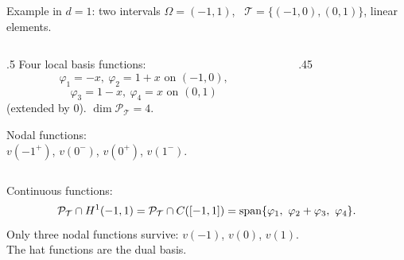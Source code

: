 \begin{frame}{Example in $d=1$: two intervals}
    $\Omega = (-1,1)$, \ $\mathcal T = \{(-1,0), (0,1)\}$, linear elements.
    \medskip

    \begin{columns}[T,onlytextwidth]
        \begin{column}{.5\textwidth}
            Four local basis functions:
            \[
                \varphi_1 = -x, \ \varphi_2 = 1 + x \text{ on } (-1,0),
            \]
            \[
                \varphi_3 = 1 - x, \ \varphi_4 = x \text{ on } (0,1)
            \]
            (extended by $0$). $\dim \mathcal P_{\mathcal T} = 4$.
            \medskip

            Nodal functions:\\ $v(-1^+)$, $v(0^-)$, $v(0^+)$, $v(1^-)$.
        \end{column}
        \begin{column}{.45\textwidth}
            \centering
        \end{column}
    \end{columns}
    \medskip
    Continuous functions:
    \[
        \mathcal P_{\mathcal T} \cap H^1(-1,1) = \mathcal P_{\mathcal T} \cap C([-1,1]) = \operatorname{span}\{\varphi_1,\ \varphi_2 + \varphi_3,\ \varphi_4\}.
    \]
    Only three nodal functions survive: $v(-1)$, $v(0)$, $v(1)$.\\ The hat functions are the dual basis.
\end{frame}


